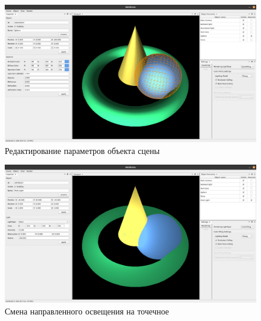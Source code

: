 \begin{figure}
	\centering
	\includegraphics[angle=90,origin=c,width=\linewidth,height=0.7\textheight,keepaspectratio]{inc/img/screenshot-2.png}
	\caption{Редактирование параметров объекта сцены}
	\label{demo:screenshot:2}
\end{figure}

\begin{figure}
	\centering
	\includegraphics[angle=90,origin=c,width=\linewidth,height=0.7\textheight,keepaspectratio]{inc/img/screenshot-3.png}
	\caption{Смена направленного освещения на точечное}
	\label{demo:screenshot:3}
\end{figure}